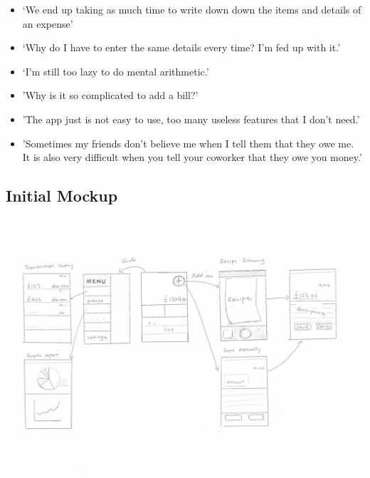 \documentclass[a4wide, 11pt]{article}
\begin{document}
\begin{itemize}
  \item ‘We end up taking as much time to write down down the items and details of an expense’
  \item ‘Why do I have to enter the same details every time? I'm fed up with it.’
  \item ‘I’m still too lazy to do mental arithmetic.’
  \item 'Why is it so complicated to add a bill?'
  \item 'The app just is not easy to use, too many useless features that I don't need.'
  \item 'Sometimes my friends don't believe me when I tell them that they owe me. It is also very difficult when you tell your coworker that they owe you money.'
\end{itemize}

\subsection{Initial Mockup}
\label{mockup}
\includegraphics[width=\textwidth]{initialMockup.jpg}
\end{document}
